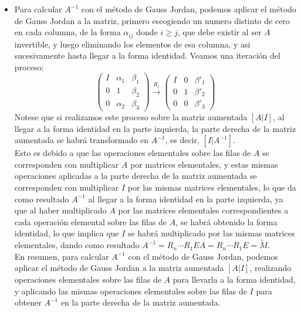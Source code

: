 {\begin{itemize}
        \item[b)] Para calcular $A^{-1}$ con el método de Gauss Jordan, podemos aplicar el método de Gauss Jordan a la matriz, primero escogiendo un numero distinto de cero en cada columna, de la forma $\alpha_{ij}$ donde $ i \geq j$, que debe existir al ser $A$ invertible, y luego eliminando los elementos de esa columna, y asi sucesivamente hasta llegar a la forma identidad. Veamos una iteración del proceso:
        \[
            \left(
            \begin{array}{c|c|c}
                I & \alpha_1 & \beta_1 \\
                \hline
                0 & 1 & \beta_2 \\
                \hline
                0 & \alpha_2 & \beta_3
            \end{array}
            \right)
            \xrightarrow{R_i}
            \left(
            \begin{array}{c|c|c}
                I & 0 & \beta'_1 \\
                \hline
                0 & 1 & \beta'_2 \\
                \hline
                0 & 0 & \beta'_3
            \end{array}
            \right)
        \]
        Notese que si realizamos este proceso sobre la matriz aumentada $[A | I]$, al llegar a la forma identidad en la parte izquierda, la parte derecha de la matriz aumentada se habrá transformado en $A^{-1}$, es decir, $[I | A^{-1}]$.\\
        Esto es debido a que las operaciones elementales sobre las filas de $A$ se corresponden con multiplicar $A$ por matrices elementales, y estas mismas operaciones aplicadas a la parte derecha de la matriz aumentada se corresponden con multiplicar $I$ por las mismas matrices elementales, lo que da como resultado $A^{-1}$ al llegar a la forma identidad en la parte izquierda, ya que al haber multiplicado $A$ por las matrices elementales correspondientes a cada operación elemental sobre las filas de $A$, se habrá obtenido la forma identidad, lo que implica que $I$ se habrá multiplicado por las mismas matrices elementales, dando como resultado $A^{-1} = R_n \cdots R_1 E A = R_n \cdots R_1 E = \widetilde{M}$.\\
        En resumen, para calcular $A^{-1}$ con el método de Gauss Jordan, podemos aplicar el método de Gauss Jordan a la matriz aumentada $[A | I]$, realizando operaciones elementales sobre las filas de $A$ para llevarla a la forma identidad, y aplicando las mismas operaciones elementales sobre las filas de $I$ para obtener $A^{-1}$ en la parte derecha de la matriz aumentada.
        \end{itemize}     
}

